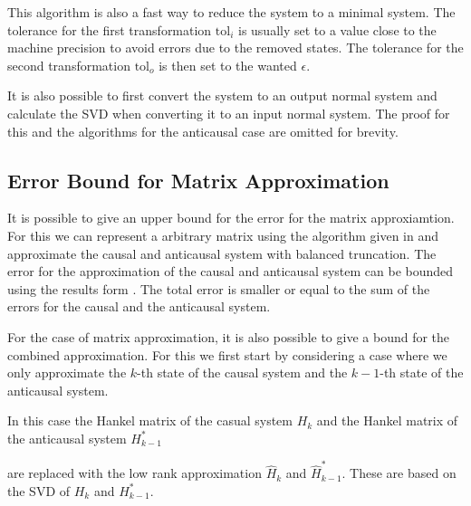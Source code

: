 \documentclass[doctype=mastersthesis,BCOR=15mm,biblatex]{ldvbook}%
\begin{document}
This algorithm is also a fast way to reduce the system to a minimal system.
The tolerance for the first transformation $\text{tol}_i$ is usually set to a value close to the machine precision to avoid errors due to the removed states.
The tolerance for the second transformation $\text{tol}_o$ is then set to the wanted $\epsilon$.
 
It is also possible to first convert the system to an output normal system and calculate the SVD when converting it to an input normal system.
The proof for this and the algorithms for the anticausal case are omitted for brevity.

 
\subsection{Error Bound for Matrix Approximation}

It is possible to give an upper bound for the error for the matrix approxiamtion.
For this we can represent a arbitrary matrix using the algorithm given in \cite{chandrasekaran_fast_2002} and approximate the causal and anticausal system with balanced truncation.
The error for the approximation of the causal and anticausal system can be bounded using the results form \cite{lall_error-bounds_2003}.
The total error is smaller or equal to the sum of the errors for the causal and the anticausal system.

For the case of matrix approximation, it is also possible to give a bound for the combined approximation.
For this we first start by considering a case where we only approximate the $k$-th state of the causal system and the $k-1$-th state of the anticausal system.

In this case the Hankel matrix of the casual system $H_k$ and the Hankel matrix of the anticausal system $H^*_{k-1}$ 

are replaced with the low rank approximation $\hat{H}_k$ and $\hat{H}^*_{k-1}$.
These are based on the SVD of $H_k$ and $H^*_{k-1}$.
\end{document}
